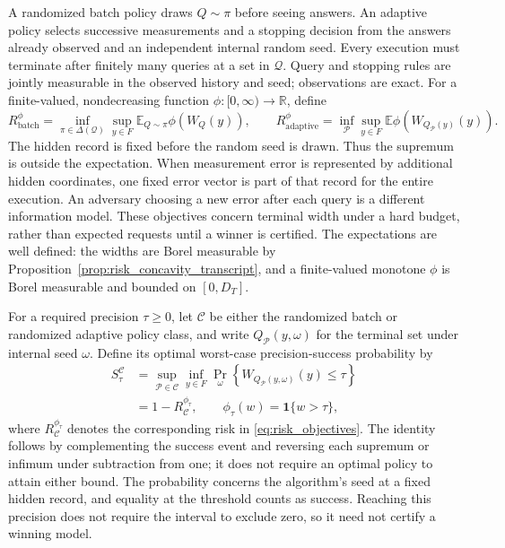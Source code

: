A randomized batch policy draws $Q\sim\pi$ before seeing answers. An
adaptive policy selects successive measurements and a stopping decision
from the answers already observed and an independent internal random
seed. Every execution must terminate after finitely many queries at a
set in $\mathcal Q$. Query and stopping rules are jointly measurable in
the observed history and seed; observations are exact. For a finite-valued,
nondecreasing function $\phi:[0,\infty)\to\mathbb R$, define
\begin{equation}
 R_{\mathrm{batch}}^{\phi}
 =\inf_{\pi\in\Delta(\mathcal Q)}\sup_{y\in F}
   \mathbb E_{Q\sim\pi}\phi(W_Q(y)),\qquad
 R_{\mathrm{adaptive}}^{\phi}
 =\inf_{\mathcal P}\sup_{y\in F}
   \mathbb E\phi(W_{Q_{\mathcal P}(y)}(y)).
 \label{eq:risk_objectives}
\end{equation}
The hidden record is fixed before the random seed is drawn. Thus the
supremum is outside the expectation. When measurement error is represented
by additional hidden coordinates, one fixed error vector is part of that
record for the entire execution. An adversary choosing a new error after
each query is a different information model. These objectives concern terminal
width under a hard budget, rather than expected requests until a winner
is certified. The expectations are well defined: the widths are Borel
measurable by Proposition~\ref{prop:risk_concavity_transcript}, and a
finite-valued monotone $\phi$ is Borel measurable and bounded on $[0,D_T]$.

For a required precision $\tau\geq0$, let $\mathcal C$ be either the
randomized batch or randomized adaptive policy class, and write
$Q_{\mathcal P}(y,\omega)$ for the terminal set under internal seed
$\omega$. Define its optimal worst-case precision-success probability by
\begin{equation}
\begin{aligned}
 S_\tau^{\mathcal C}
 &=\sup_{\mathcal P\in\mathcal C}\inf_{y\in F}
   \Pr_\omega\!\left\{W_{Q_{\mathcal P}(y,\omega)}(y)\leq\tau\right\}\\
 &=1-R_{\mathcal C}^{\phi_\tau},\qquad
   \phi_\tau(w)=\boldsymbol{1}\{w>\tau\},
\end{aligned}
\label{eq:risk_precision_success}
\end{equation}
where $R_{\mathcal C}^{\phi_\tau}$ denotes the corresponding risk in
\eqref{eq:risk_objectives}. The identity follows by complementing the
success event and reversing each supremum or infimum under subtraction
from one; it does not require an optimal policy to attain either bound.
The probability concerns the algorithm's seed at a fixed hidden record,
and equality at the threshold counts as success. Reaching this precision
does not require the interval to exclude zero, so it need not certify a
winning model.

